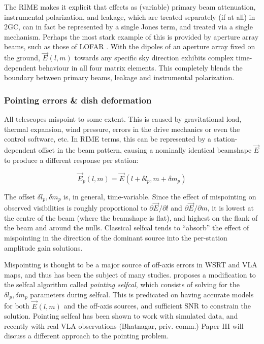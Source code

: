 \documentclass{aa}
\newcommand{\jones}[2]{\vec {#1}_{#2}}
\begin{document}
The RIME makes it explicit that effects as (variable) primary beam attenuation, instrumental polarization, and leakage, which are treated separately (if at all) in 2GC, can in fact be represented by a single Jones term, and treated via a single mechanism. Perhaps the most stark example of this is provided by aperture array beams, such as those of LOFAR \citep{Yatawatta:LOFAR-beam}. With the dipoles of an aperture array fixed on the ground, 
$\jones{E}{}(l,m)$ towards any specific sky direction exhibits complex time-dependent behaviour in all four matrix elements. This completely blends the boundary between primary beams, leakage and instrumental polarization.

\subsubsection{Pointing errors \& dish deformation\label{sec:pointing}}

All telescopes mispoint to some extent. This is caused by gravitational load, thermal expansion, wind pressure, errors in the drive mechanics or even the control software, etc. In RIME terms, this can be represented by a station-dependent offset in the beam pattern, causing a nominally identical beamshape $\jones{E}{}$ to produce a different response per station:

\begin{equation}\label{eq:mispointing}
\jones{E}{p}(l,m) = \jones{E}{}(l+\delta l_p,m+\delta m_p)
\end{equation}

The offset $\delta l_p,\delta m_p$ is, in general, time-variable. Since the effect of mispointing on observed visibilities is roughly proportional to $\partial\jones{E}{}/\partial l$ and $\partial \jones{E}{}/\partial m$, it is lowest at the centre of the beam (where the beamshape is flat), and highest on the flank of the beam and around the nulls. Classical selfcal tends to  ``absorb'' the effect of mispointing in the direction of the dominant source
into the per-station amplitude gain solutions. 

Mispointing is thought to be a major source of off-axis errors in WSRT and VLA maps, and thus has been the subject of many studies. \citet{SB:pointing} proposes a modification to the selfcal algorithm called {\em pointing selfcal}, which consists of solving for the $\delta l_p,\delta m_p$ parameters during selfcal. This is predicated on having accurate models for both $\jones{E}{}(l,m)$ and the off-axis sources, and sufficient SNR to constrain the solution. Pointing selfcal has been shown to work with simulated data, and recently with real VLA observations (Bhatnagar, priv. comm.) Paper III \citep{RRIME3} will discuss a different approach to the pointing problem.
\end{document}
